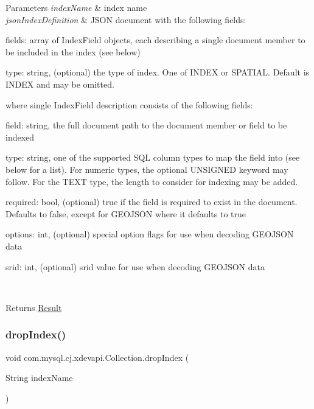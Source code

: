 \begin{DoxyParams}{Parameters}
{\em index\+Name} & index name \\
\hline
{\em json\+Index\+Definition} & J\+S\+ON document with the following fields\+: 
\begin{DoxyItemize}
\item fields\+: array of Index\+Field objects, each describing a single document member to be included in the index (see below) 
\item type\+: string, (optional) the type of index. One of I\+N\+D\+EX or S\+P\+A\+T\+I\+AL. Default is I\+N\+D\+EX and may be omitted. 
\end{DoxyItemize}where single Index\+Field description consists of the following fields\+: 
\begin{DoxyItemize}
\item field\+: string, the full document path to the document member or field to be indexed 
\item type\+: string, one of the supported S\+QL column types to map the field into (see below for a list). For numeric types, the optional U\+N\+S\+I\+G\+N\+ED keyword may follow. For the T\+E\+XT type, the length to consider for indexing may be added. 
\item required\+: bool, (optional) true if the field is required to exist in the document. Defaults to false, except for G\+E\+O\+J\+S\+ON where it defaults to true 
\item options\+: int, (optional) special option flags for use when decoding G\+E\+O\+J\+S\+ON data 
\item srid\+: int, (optional) srid value for use when decoding G\+E\+O\+J\+S\+ON data 
\end{DoxyItemize}\\
\hline
\end{DoxyParams}
\begin{DoxyReturn}{Returns}
\mbox{\hyperlink{interfacecom_1_1mysql_1_1cj_1_1xdevapi_1_1_result}{Result}} 
\end{DoxyReturn}
\mbox{\label{interfacecom_1_1mysql_1_1cj_1_1xdevapi_1_1_collection_a148bfe19c511fac4e0117d596fd08aa4}} 
\subsubsection{\texorpdfstring{drop\+Index()}{dropIndex()}}
{\footnotesize\ttfamily void com.\+mysql.\+cj.\+xdevapi.\+Collection.\+drop\+Index (\begin{DoxyParamCaption}\item[{String}]{index\+Name }\end{DoxyParamCaption})}

